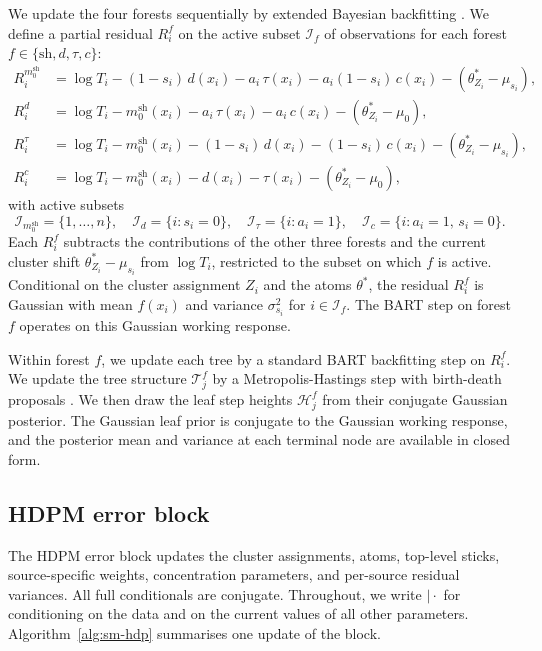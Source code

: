 We update the four forests sequentially by extended Bayesian backfitting \citep{hastie2000bayesian, chipman2010bart}.
We define a partial residual $R_i^f$ on the active subset $\mathcal{I}_f$ of observations for each forest $f \in \{\mathrm{sh}, d, \tau, c\}$:
\begin{align}
R_i^{m_0^{\mathrm{sh}}} &= \log T_i - (1-s_i)\, d(x_i) - a_i\, \tau(x_i) - a_i(1-s_i)\, c(x_i) - (\theta_{Z_i}^* - \mu_{s_i}),\\
R_i^{d} &= \log T_i - m_0^{\mathrm{sh}}(x_i) - a_i\, \tau(x_i) - a_i\, c(x_i) - (\theta_{Z_i}^* - \mu_0),\\
R_i^{\tau} &= \log T_i - m_0^{\mathrm{sh}}(x_i) - (1-s_i)\, d(x_i) - (1-s_i)\, c(x_i) - (\theta_{Z_i}^* - \mu_{s_i}),\\
R_i^{c} &= \log T_i - m_0^{\mathrm{sh}}(x_i) - d(x_i) - \tau(x_i) - (\theta_{Z_i}^* - \mu_0),
\end{align}
with active subsets
\begin{equation}
\mathcal{I}_{m_0^{\mathrm{sh}}} = \{1, \ldots, n\},\quad
\mathcal{I}_d = \{i : s_i = 0\},\quad
\mathcal{I}_\tau = \{i : a_i = 1\},\quad
\mathcal{I}_c = \{i : a_i = 1,\, s_i = 0\}.
\end{equation}
Each $R_i^f$ subtracts the contributions of the other three forests and the current cluster shift $\theta_{Z_i}^* - \mu_{s_i}$ from $\log T_i$, restricted to the subset on which $f$ is active.
Conditional on the cluster assignment $Z_i$ and the atoms $\theta^*$, the residual $R_i^f$ is Gaussian with mean $f(x_i)$ and variance $\sigma_{s_i}^2$ for $i \in \mathcal{I}_f$. The BART step on forest $f$ operates on this Gaussian working response.

Within forest $f$, we update each tree by a standard BART backfitting step on $R_i^f$.
We update the tree structure $\mathcal{T}_j^f$ by a Metropolis-Hastings step with birth-death proposals \citep{chipman1998bayesian, kapelner2016bartmachine}.
We then draw the leaf step heights $\mathcal{H}_j^f$ from their conjugate Gaussian posterior.
The Gaussian leaf prior is conjugate to the Gaussian working response, and the posterior mean and variance at each terminal node are available in closed form.

\subsection{HDPM error block}

The HDPM error block updates the cluster assignments, atoms, top-level sticks, source-specific weights, concentration parameters, and per-source residual variances.
All full conditionals are conjugate.
Throughout, we write $\mid \cdot$ for conditioning on the data and on the current values of all other parameters.
Algorithm~\ref{alg:sm-hdp} summarises one update of the block.

